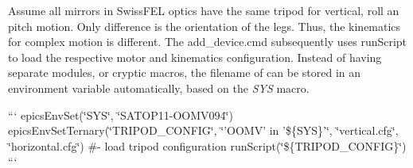 Assume all mirrors in Swiss\-F\-E\-L optics have the same tripod for vertical, roll an pitch motion. Only difference is the orientation of the legs. Thus, the kinematics for complex motion is different. The add\-\_\-device.\-cmd subsequently uses {\ttfamily run\-Script} to load the respective motor and kinematics configuration. Instead of having separate modules, or cryptic macros, the filename of can be stored in an environment variable automatically, based on the {\itshape S\-Y\-S} macro.

``` epics\-Env\-Set(\char`\"{}\-S\-Y\-S\char`\"{}, \char`\"{}\-S\-A\-T\-O\-P11-\/\-O\-O\-M\-V094\char`\"{}) epics\-Env\-Set\-Ternary(\char`\"{}\-T\-R\-I\-P\-O\-D\-\_\-\-C\-O\-N\-F\-I\-G\char`\"{}, \char`\"{}'\-O\-O\-M\-V' in '\$\{\-S\-Y\-S\}'\char`\"{}, \char`\"{}vertical.\-cfg\char`\"{}, \char`\"{}horizontal.\-cfg\char`\"{}) \#-\/ load tripod configuration run\-Script(\char`\"{}\$\{\-T\-R\-I\-P\-O\-D\-\_\-\-C\-O\-N\-F\-I\-G\}\char`\"{}) ``` 